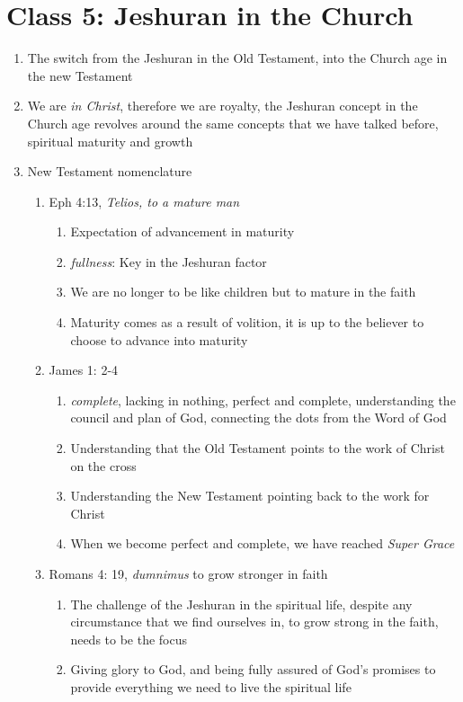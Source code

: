 \documentclass[11pt]{article}
\begin{document}
\section{Class 5: Jeshuran in the Church}
\begin{enumerate}
	\item The switch from the Jeshuran in the Old Testament, into the Church age in the new Testament
	\item We are \emph{in Christ}, therefore we are royalty, the Jeshuran concept in the Church age revolves around the same concepts that we have talked before, spiritual maturity and growth
	\item New Testament nomenclature
	\begin{enumerate}
		\item Eph 4:13, \emph{Telios, to a mature man}
		\begin{enumerate}
			\item Expectation of advancement in maturity
			\item \emph{fullness}: Key in the Jeshuran factor
			\item We are no longer to be like children but to mature in the faith
			\item Maturity comes as a result of volition, it is up to the believer to choose to advance into maturity
		\end{enumerate}
		\item James 1: 2-4
		\begin{enumerate}
			\item \emph{complete}, lacking in nothing, perfect and complete, understanding the council and plan of God, connecting the dots from the Word of God
			\item Understanding that the Old Testament points to the work of Christ on the cross
			\item Understanding the New Testament pointing back to the work for Christ
			\item When we become perfect and complete, we have reached \emph{Super Grace}
		\end{enumerate}
		\item Romans 4: 19, \emph{dumnimus} to grow stronger in faith
		\begin{enumerate}
			\item The challenge of the Jeshuran in the spiritual life, despite any circumstance that we find ourselves in, to grow strong in the faith, needs to be the focus
			\item Giving glory to God, and being fully assured of God's promises to provide everything we need to live the spiritual life

\end{enumerate}
\end{enumerate}
\end{enumerate}
\end{document}
